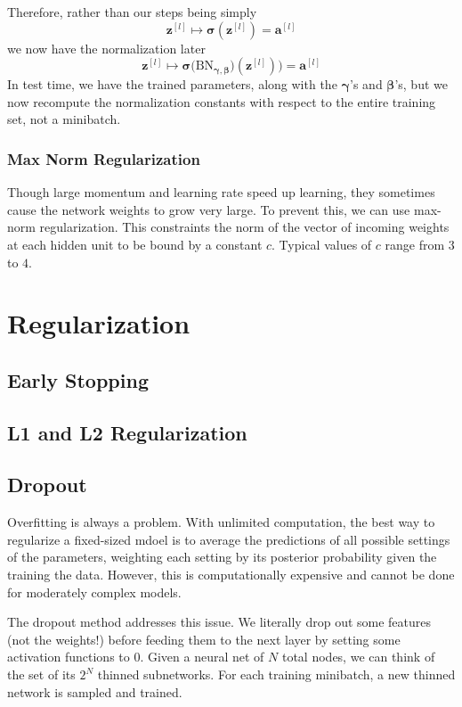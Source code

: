 \documentclass{article}
\theoremstyle{definition}
\theoremstyle{remark}
\theoremstyle{definition}
\begin{document}
      Therefore, rather than our steps being simply 
      \[\mathbf{z}^{[l]} \mapsto \boldsymbol{\sigma}(\mathbf{z}^{[l]}) = \mathbf{a}^{[l]}\]
      we now have the normalization later 
      \[\mathbf{z}^{[l]} \mapsto \boldsymbol{\sigma}\big( \mathrm{BN}_{\boldsymbol{\gamma}, \boldsymbol{\beta}})(\mathbf{z}^{[l]}) \big) = \mathbf{a}^{[l]}\]
      In test time, we have the trained parameters, along with the $\boldsymbol{\gamma}$'s and $\boldsymbol{\beta}$'s, but we now recompute the normalization constants with respect to the entire training set, not a minibatch. 

    \subsubsection{Max Norm Regularization}

      Though large momentum and learning rate speed up learning, they sometimes cause the network weights to grow very large. To prevent this, we can use max-norm regularization. This constraints the norm of the vector of incoming weights at each hidden unit to be bound by a constant $c$. Typical values of $c$ range from $3$ to $4$. 

\section{Regularization}

  \subsection{Early Stopping}

  \subsection{L1 and L2 Regularization}

  \subsection{Dropout}

    Overfitting is always a problem. With unlimited computation, the best way to regularize a fixed-sized mdoel is to average the predictions of all possible settings of the parameters, weighting each setting by its posterior probability given the training the data. However, this is computationally expensive and cannot be done for moderately complex models. 

    The dropout method addresses this issue. We literally drop out some features (not the weights!) before feeding them to the next layer by setting some activation functions to $0$. Given a neural net of $N$ total nodes, we can think of the set of its $2^N$ thinned subnetworks. For each training minibatch, a new thinned network is sampled and trained. 
\end{document}
